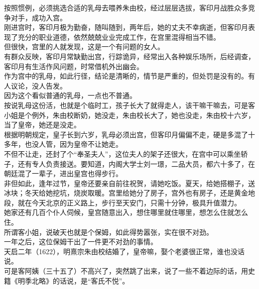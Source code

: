 \begin{multicols}{\theparacolNo}
按照惯例，必须挑选合适的乳母去喂养朱由校，经过层层选拔，客印月战胜众多竞争对手，成功入宫。\\

刚进宫时，客印月极为勤奋，随叫随到，两年后，她的丈夫不幸病逝，但客印月表现了充分的职业道德，依然兢兢业业完成工作，在宫里混得相当不错。\\

但很快，宫里的人就发现，这是一个有问题的女人。\\

有群众反映，客印月常缺勤出宫，行踪诡异，经常出入各种娱乐场所，后经调查，客印月有生活作风问题，时常借机外出幽会。\\

作为宫中的乳母，如此行径，结论是清晰的，情节是严重的，但处罚是没有的。有人议论，没人告发。\\

因为这个看似普通的乳母，一点也不普通。\\

按说乳母这份活，也就是个临时工，孩子长大了就得走人，该干嘛干嘛去，可是客小姐是个例外，朱由校断奶，她没走，朱由校长大了，她也没走，朱由校十六岁，当了皇帝，她还是没走。\\

根据明朝规定，皇子长到六岁，乳母必须出宫，但客印月偏偏不走，硬是多混了十多年，也没人管，因为皇帝不让她走。\\

不但不让走，还封了个“奉圣夫人”，这位夫人的架子还很大，在宫中可以乘坐轿子，还有专人负责接送。要知道，内阁大学士刘一璟，二品大员，都六十多了，在朝廷混了一辈子，进出皇宫也得步行。\\

非但如此，逢年过节，皇帝还要亲自前往祝贺，请她吃饭。夏天，给她搭棚子，送冰块；冬天给她挖坑，烧炭取暖。宫里给她分了房子，宫外也有房子，还是黄金地段，就在今天北京的正义路上，步行至天安门，只需十分钟，极具升值潜力。\\

她家还有几百个仆人伺候，皇宫随意出入，想住哪里就住哪里，想怎么住就怎么住。\\

所谓客小姐，说破天也就是个保姆，如此得势嚣张，实在很不对劲。\\

一年之后，这位保姆干出了一件更不对劲的事情。\\

天启二年（1622），明熹宗朱由校结婚了，皇帝嘛，娶个老婆很正常，谁也没话说。\\

可是客阿姨（三十五了）不高兴了，突然跳了出来，说了一些不着边际的话，用史籍《明季北略》的话说，是“客氏不悦”。\\


\end{multicols}
